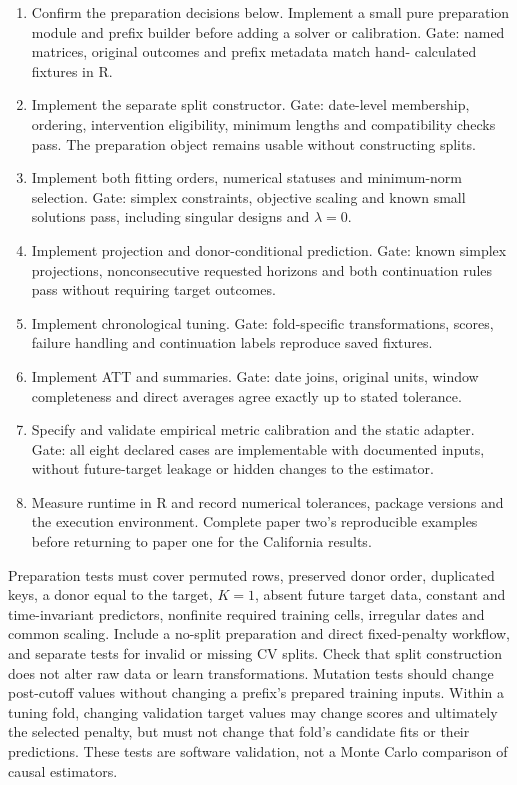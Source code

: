 \documentclass[11pt]{article}
\begin{document}
\begin{enumerate}
\item Confirm the preparation decisions below. Implement a small pure
preparation module and prefix builder before adding a solver or calibration.
Gate: named matrices, original outcomes and prefix metadata match hand-
calculated fixtures in R.
\item Implement the separate split constructor. Gate: date-level membership,
ordering, intervention eligibility, minimum lengths and compatibility checks
pass. The preparation object remains usable without constructing splits.
\item Implement both fitting orders, numerical statuses and minimum-norm
selection. Gate: simplex constraints, objective scaling and known small
solutions pass, including singular designs and $\lambda=0$.
\item Implement projection and donor-conditional prediction. Gate: known
simplex projections, nonconsecutive requested horizons and both continuation
rules pass without requiring target outcomes.
\item Implement chronological tuning. Gate: fold-specific transformations,
scores, failure handling and continuation labels reproduce saved fixtures.
\item Implement ATT and summaries. Gate: date joins, original units,
window completeness and direct averages agree exactly up to stated tolerance.
\item Specify and validate empirical metric calibration and the static
adapter. Gate: all eight declared cases are implementable with documented
inputs, without future-target leakage or hidden changes to the estimator.
\item Measure runtime in R and record numerical tolerances, package
versions and the execution environment. Complete paper two's reproducible
examples before returning to paper one for the California results.
\end{enumerate}

Preparation tests must cover permuted rows, preserved donor order,
duplicated keys, a donor equal to the target, $K=1$, absent future target
data, constant and time-invariant predictors, nonfinite required training
cells, irregular dates and common scaling. Include a no-split preparation
and direct fixed-penalty workflow, and separate tests for invalid or missing
CV splits. Check that split construction does not alter raw data or learn
transformations. Mutation tests should change
post-cutoff values without changing a prefix's prepared training inputs.
Within a tuning fold, changing validation target values may change scores
and ultimately the selected penalty, but must not change that fold's
candidate fits or their predictions. These tests are software validation,
not a Monte Carlo comparison of causal estimators.
\end{document}
